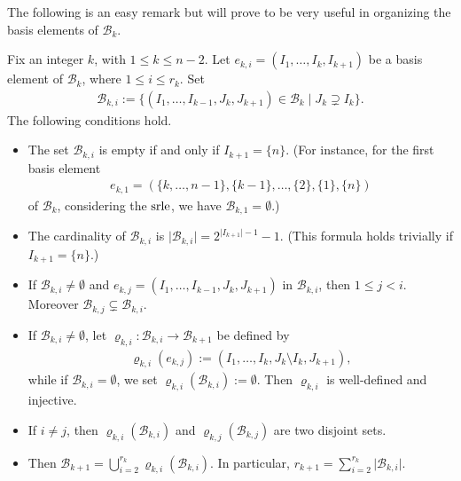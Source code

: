 \documentclass[ALCO]{cedram}
\newcommand{\mcb}{\mbox{$\mathcal{B}$}}
\newcommand{\srle}{\mbox{${\rm srle}$}}
\begin{document}
The following is an easy remark but will prove to be very useful in
organizing the basis elements of $\mcb_k$.

\begin{remark}\label{bki}
Fix an integer $k$, with $1\leq k\leq n-2$. Let $e_{k,i}=(I_1,\ldots
,I_k,I_{k+1})$ be a basis element of $\mcb_k$, where $1\leq i\leq
r_{k}$. Set
\begin{eqnarray*}
\mcb_{k,i}:=\{(I_1,\ldots ,I_{k-1},J_k,J_{k+1})\in\mcb_k\mid
J_k\supsetneq I_k\}.
\end{eqnarray*}
The following conditions hold.
\begin{itemize}
\item[$(a)$] The set $\mcb_{k,i}$ is empty if and only if
  $I_{k+1}=\{n\}$. (For instance, for the first basis element
\begin{eqnarray*}  
e_{k,1}=(\{k,\ldots ,n-1\},\{k-1\},\ldots ,\{2\},\{1\},\{n\})
\end{eqnarray*} 
of $\mcb_k$, considering the $\srle$, we have $\mcb_{k,1}=\emptyset$.)
\item[$(b)$] The cardinality of $\mcb_{k,i}$ is $\lvert
  \mcb_{k,i}\rvert=2^{\lvert I_{k+1}\rvert -1}-1$. (This formula holds
  trivially if $I_{k+1}=\{n\}$.)
\item[$(c)$] If $\mcb_{k,i}\neq \emptyset$ and $e_{k,j}=(I_1,\ldots
  ,I_{k-1},J_k,J_{k+1})$ in $\mcb_{k,i}$, then $1\leq j<i$. Moreover
  $\mcb_{k,j}\subsetneq\mcb_{k,i}$.
\item[$(d)$] If $\mcb_{k,i}\neq \emptyset$, let
  $\varrho_{k,i}:\mcb_{k,i}\to\mcb_{k+1}$ be defined by
\begin{eqnarray*}
\varrho_{k,i}(e_{k,j}):=(I_1,\ldots ,I_k,J_k\setminus I_k,J_{k+1}),
\end{eqnarray*}
while if $\mcb_{k,i}=\emptyset$, we set $\varrho_{k,i}(\mcb_{k,i}):=\emptyset$.
Then $\varrho_{k,i}$ is well-defined and injective.
\item[$(e)$] If $i\neq j$, then $\varrho_{k,i}(\mcb_{k,i})$ and
  $\varrho_{k,j}(\mcb_{k,j})$ are two disjoint sets.
\item[$(f)$] Then $\mcb_{k+1}=\bigcup_{i=2}^{r_k}\varrho_{k,i}(\mcb_{k,i})$.
In particular, $r_{k+1}=\sum_{i=2}^{r_k}\lvert\mcb_{k,i}\rvert$.
\end{itemize}
\end{remark}
\end{document}
